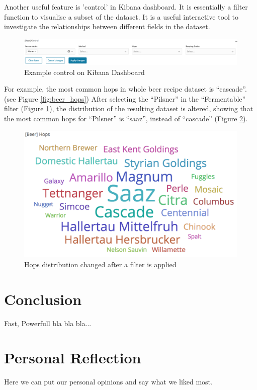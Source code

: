 \documentclass[bibliography=totoc]{article}
\begin{document}
Another useful feature is 'control' in Kibana dashboard. It is essentially a filter function to visualise a subset of the dataset. It is a useful interactive tool to investigate the relationships between different fields in the dataset.



\begin{figure}
  \centering
  \includegraphics[width=\linewidth]{beer_control.png}
 \caption{Example control on Kibana Dashboard}
  \label{fig:beer_control}
\end{figure}

For example, the most common hops in whole beer recipe dataset is ``cascade''. (see Figure \ref{fig:beer_hops}) After selecting the ``Pilsner'' in the ``Fermentable'' filter (Figure \ref{fig:beer_control}), the distribution of the resulting dataset is altered, showing that the most common hops for ``Pilsner'' is ``saaz'', instead of ``cascade'' (Figure \ref{fig:beer_hops_after}). 

\begin{figure}
  \centering
  \includegraphics[width=\linewidth]{beer_hops_after.png}
 \caption{Hops distribution changed after a filter is applied}
  \label{fig:beer_hops_after}
\end{figure}



\section{Conclusion}
Fast, Powerfull bla bla bla...

\section{Personal Reflection}
Here we can put our personal opinions and say what we liked most.
\end{document}
